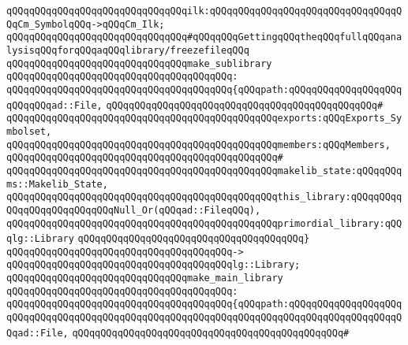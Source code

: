 \newline
\verb|qQQqqQQqqQQqqQQqqQQqqQQqqQQqqQQqilk:qQQqqQQqqQQqqQQqqQQqqQQqqQQqqQQqqQQqCm_SymbolqQQq->qQQqCm_Ilk;|\newline
\newline
\verb|qQQqqQQqqQQqqQQqqQQqqQQqqQQqqQQq#qQQqqQQqGettingqQQqtheqQQqfullqQQqanalysisqQQqforqQQqaqQQqlibrary/freezefileqQQq|\newline
\newline
\verb|qQQqqQQqqQQqqQQqqQQqqQQqqQQqqQQqmake_sublibrary|\newline
\verb|qQQqqQQqqQQqqQQqqQQqqQQqqQQqqQQqqQQqqQQq:|\newline
\verb|qQQqqQQqqQQqqQQqqQQqqQQqqQQqqQQqqQQqqQQq{qQQqpath:qQQqqQQqqQQqqQQqqQQqqQQqqQQqad::File,|\newline
\verb|qQQqqQQqqQQqqQQqqQQqqQQqqQQqqQQqqQQqqQQqqQQqqQQq#|\newline
\verb|qQQqqQQqqQQqqQQqqQQqqQQqqQQqqQQqqQQqqQQqqQQqqQQqexports:qQQqExports_Symbolset,|\newline
\verb|qQQqqQQqqQQqqQQqqQQqqQQqqQQqqQQqqQQqqQQqqQQqqQQqmembers:qQQqMembers,|\newline
\verb|qQQqqQQqqQQqqQQqqQQqqQQqqQQqqQQqqQQqqQQqqQQqqQQq#|\newline
\verb|qQQqqQQqqQQqqQQqqQQqqQQqqQQqqQQqqQQqqQQqqQQqqQQqmakelib_state:qQQqqQQqms::Makelib_State,|\newline
\verb|qQQqqQQqqQQqqQQqqQQqqQQqqQQqqQQqqQQqqQQqqQQqqQQqthis_library:qQQqqQQqqQQqqQQqqQQqqQQqqQQqNull_Or(qQQqad::FileqQQq),|\newline
\verb|qQQqqQQqqQQqqQQqqQQqqQQqqQQqqQQqqQQqqQQqqQQqqQQqprimordial_library:qQQqlg::Library|\newline
\verb|qQQqqQQqqQQqqQQqqQQqqQQqqQQqqQQqqQQqqQQq}|\newline
\verb|qQQqqQQqqQQqqQQqqQQqqQQqqQQqqQQqqQQqqQQq->|\newline
\verb|qQQqqQQqqQQqqQQqqQQqqQQqqQQqqQQqqQQqqQQqlg::Library;|\newline
\newline
\newline
\verb|qQQqqQQqqQQqqQQqqQQqqQQqqQQqqQQqmake_main_library|\newline
\verb|qQQqqQQqqQQqqQQqqQQqqQQqqQQqqQQqqQQqqQQq:|\newline
\verb|qQQqqQQqqQQqqQQqqQQqqQQqqQQqqQQqqQQqqQQq{qQQqpath:qQQqqQQqqQQqqQQqqQQqqQQqqQQqqQQqqQQqqQQqqQQqqQQqqQQqqQQqqQQqqQQqqQQqqQQqqQQqqQQqqQQqqQQqqQQqad::File,|\newline
\verb|qQQqqQQqqQQqqQQqqQQqqQQqqQQqqQQqqQQqqQQqqQQqqQQq#|\newline

